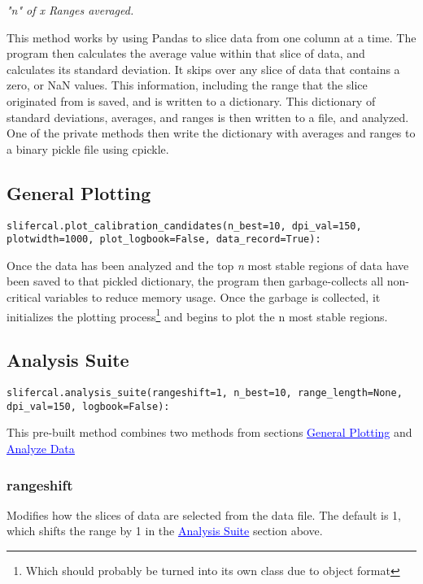 \documentclass[12pt]{article}
\begin{document}
\begin{center}
\textit{"n" of x Ranges averaged.}
\end{center}     

This method works by using Pandas to slice data from one column at a time. The program then calculates the average value within that slice of data, and calculates its standard deviation. It skips over any slice of data that contains a zero, or NaN values. This information, including the range that the slice originated from is saved, and is written to a dictionary. This dictionary of standard deviations, averages, and ranges is then written to a file, and analyzed. One of the private methods then write the dictionary with averages and ranges to a binary pickle file using cpickle.

\subsection{General Plotting}
\label{subsec:General Plotting}
\begin{lstlisting}
slifercal.plot_calibration_candidates(n_best=10, dpi_val=150, plotwidth=1000, plot_logbook=False, data_record=True):
\end{lstlisting}
Once the data has been analyzed and the top \textit{n} most stable regions of data have been saved to that pickled dictionary, the program then garbage-collects all non-critical variables to reduce memory usage.  Once the garbage is collected, it initializes the plotting process\footnote{Which should probably be turned into its own class due to object format} and begins to plot the n most stable regions.

\subsection{Analysis Suite}
\label{Analysis Suite}
\begin{lstlisting}
slifercal.analysis_suite(rangeshift=1, n_best=10, range_length=None, dpi_val=150, logbook=False): 
\end{lstlisting}
This pre-built method combines two methods from sections \hyperref[subsec:General Plotting]{\textcolor{blue}{\underline{General Plotting}}} and \hyperref[subsec:Analyze Data]{\textcolor{blue}{\underline{Analyze Data}}}

\subsubsection{range{\textunderscore}shift}
Modifies how the slices of data are selected from the data file. The default is 1, which shifts the range by 1 in the \hyperref[subsec:Analysis Suite]{\textcolor{blue}{\underline{Analysis Suite}}} section above.
\end{document}
